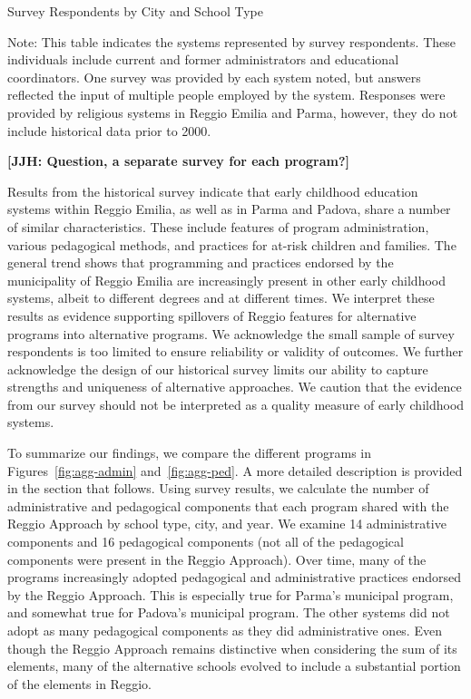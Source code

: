 \begin{table}[H]
\centering
\caption{Survey Respondents by City and School Type}\label{tab:respondents}
\begin{threeparttable}
	
\begin{tablenotes}
Note: This table indicates the systems represented by survey respondents. These individuals include current and former administrators and educational coordinators. One survey was provided by each system noted, but answers reflected the input of multiple people employed by the system. Responses were provided by religious systems in Reggio Emilia and Parma, however, they do not include historical data prior to 2000.
\end{tablenotes}
\end{threeparttable}
\end{table}

\textbf{[JJH: Question, a separate survey for each program?]}

Results from the historical survey indicate that early childhood education systems within Reggio Emilia, as well as in Parma and Padova, share a number of similar characteristics. These include features of program administration, various pedagogical methods, and practices for at-risk children and families. The general trend shows that programming and practices endorsed by the municipality of Reggio Emilia are increasingly present in other early childhood systems, albeit to different degrees and at different times. We interpret these results as evidence supporting spillovers of Reggio features for alternative programs into alternative programs. We acknowledge the small sample of survey respondents is too limited to ensure reliability or validity of outcomes. We further acknowledge the design of our historical survey limits our ability to capture strengths and uniqueness of alternative approaches. We caution that the evidence from our survey should not be interpreted as a quality measure of early childhood systems.

To summarize our findings, we compare the different programs in Figures~\ref{fig:agg-admin} and~\ref{fig:agg-ped}. A more detailed description is provided in the section that follows. Using survey results, we calculate the number of administrative and pedagogical components that each program shared with the Reggio Approach by school type, city, and year. We examine 14 administrative components and 16 pedagogical components (not all of the pedagogical components were present in the Reggio Approach). Over time, many of the programs increasingly adopted pedagogical and administrative practices endorsed by the Reggio Approach. This is especially true for Parma's municipal program, and somewhat true for Padova's municipal program. The other systems did not adopt as many pedagogical components as they did administrative ones. Even though the Reggio Approach remains distinctive when considering the sum of its elements, many of the alternative schools evolved to include a substantial portion of the elements in Reggio.

